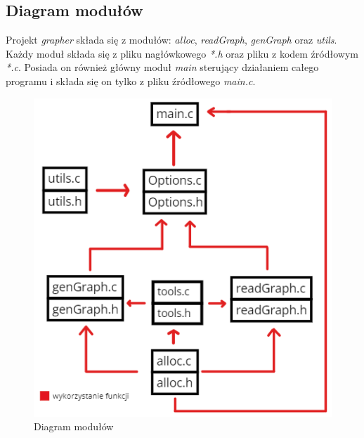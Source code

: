 \documentclass[10pt, a4paper]{report}
\begin{document}
    \subsection{Diagram modułów}
    Projekt \textit{grapher} składa się z modułów: \textit{alloc}, \textit{readGraph}, \textit{genGraph} oraz \textit{utils}. 
    Każdy moduł składa się z pliku nagłówkowego \textit{*.h} oraz pliku z kodem źródłowym \textit{*.c}.
    Posiada on również główny moduł \textit{main} sterujący działaniem całego programu i składa się on tylko z pliku źródłowego \textit{main.c}.
    \begin{figure}[ht]
        \begin{center}
            \includegraphics[scale=0.8]{module_diagram_new.png}
            \caption {Diagram modułów}
        \end{center}
    \end{figure}
\end{document}
